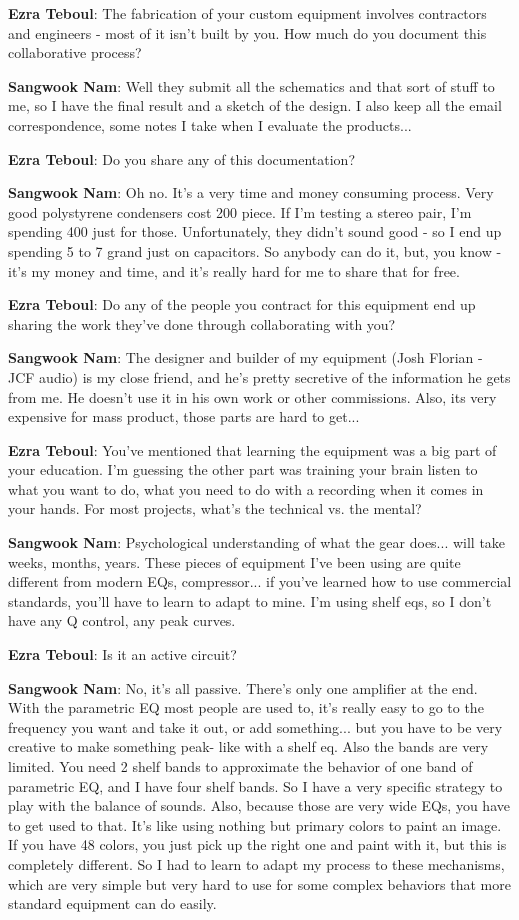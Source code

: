 \textbf{Ezra Teboul}: The fabrication of your custom equipment involves contractors and engineers - most of it isn't built by you. How much do you document this collaborative process?

\textbf{Sangwook Nam}: Well they submit all the schematics and that sort of stuff to me, so I have the final result and a sketch of the design. I also keep all the email correspondence, some notes I take when I evaluate the products...

\textbf{Ezra Teboul}: Do you share any of this documentation?

\textbf{Sangwook Nam}: Oh no. It's a very time and money consuming process. Very good polystyrene condensers cost 200 piece. If I'm testing a stereo pair, I'm spending 400 just for those. Unfortunately, they didn't sound good - so I end up spending 5 to 7 grand just on capacitors. So anybody can do it, but, you know - it's my money and time, and it's really hard for me to share that for free.

\textbf{Ezra Teboul}: Do any of the people you contract for this equipment end up sharing the work they've done through collaborating with you?

\textbf{Sangwook Nam}: The designer and builder of my equipment (Josh Florian - JCF audio) is my close friend, and he's pretty secretive of the information he gets from me. He doesn't use it in his own work or other commissions. Also, its very expensive for mass product, those parts are hard to get...

\textbf{Ezra Teboul}: You've mentioned that learning the equipment was a big part of your education. I'm guessing the other part was training your brain listen to what you want to do, what you need to do with a recording when it comes in your hands. For most projects, what's the technical vs. the mental?

\textbf{Sangwook Nam}: Psychological understanding of what the gear does... will take weeks, months, years. These pieces of equipment I've been using are quite different from modern EQs, compressor... if you've learned how to use commercial standards, you'll have to learn to adapt to mine. I'm using shelf eqs, so I don't have any Q control, any peak curves.

\textbf{Ezra Teboul}: Is it an active circuit?

\textbf{Sangwook Nam}: No, it's all passive. There's only one amplifier at the end. With the parametric EQ most people are used to, it's really easy to go to the frequency you want and take it out, or add something... but you have to be very creative to make something peak- like with a shelf eq. Also the bands are very limited. You need 2 shelf bands to approximate the behavior of one band of parametric EQ, and I have four shelf bands. So I have a very specific strategy to play with the balance of sounds. Also, because those are very wide EQs, you have to get used to that. It's like using nothing but primary colors to paint an image. If you have 48 colors, you just pick up the right one and paint with it, but this is completely different. So I had to learn to adapt my process to these mechanisms, which are very simple but very hard to use for some complex behaviors that more standard equipment can do easily.

